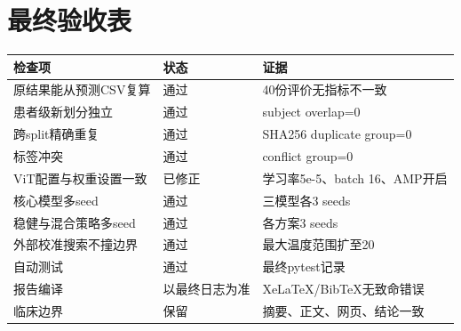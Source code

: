 \section{最终验收表}
\begin{longtable}{p{}p{}p{}}
\toprule 检查项 & 状态 & 证据\\\midrule
\endhead
原结果能从预测CSV复算 & 通过 & 40份评价无指标不一致\\
患者级新划分独立 & 通过 & subject overlap=0\\
跨split精确重复 & 通过 & SHA256 duplicate group=0\\
标签冲突 & 通过 & conflict group=0\\
ViT配置与权重设置一致 & 已修正 & 学习率5e-5、batch 16、AMP开启\\
核心模型多seed & 通过 & 三模型各3 seeds\\
稳健与混合策略多seed & 通过 & 各方案3 seeds\\
外部校准搜索不撞边界 & 通过 & 最大温度范围扩至20\\
自动测试 & 通过 & 最终pytest记录\\
报告编译 & 以最终日志为准 & XeLaTeX/BibTeX无致命错误\\
临床边界 & 保留 & 摘要、正文、网页、结论一致\\
\bottomrule
\end{longtable}
